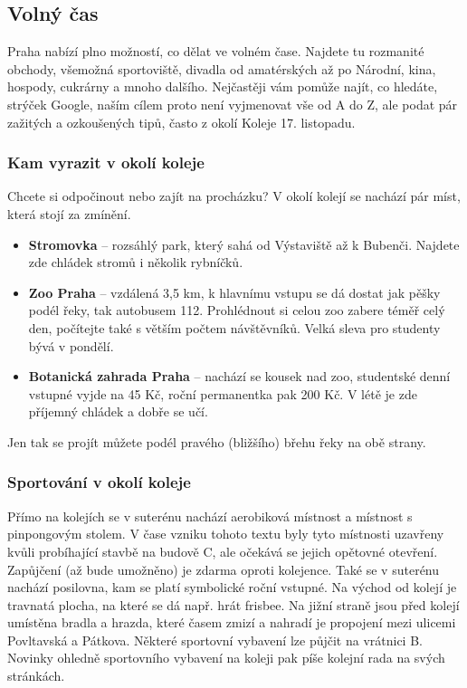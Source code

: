 \subsection{Volný čas}
Praha nabízí plno možností, co dělat ve volném čase. Najdete tu rozmanité
obchody, všemožná sportoviště, divadla od amatérských až po Národní, kina,
hospody, cukrárny a mnoho dalšího. Nejčastěji vám pomůže najít,
co hledáte, strýček Google, naším cílem proto není vyjmenovat vše od A do Z, ale
podat pár zažitých a ozkoušených tipů, často z okolí Koleje 17. listopadu.


\subsubsection{Kam vyrazit v okolí koleje}
Chcete si odpočinout nebo zajít na procházku? V okolí kolejí se nachází pár míst, která stojí za zmínění.
\begin{itemize}
\item \textbf{Stromovka} – rozsáhlý park, který sahá od Výstaviště až k Bubenči. Najdete zde chládek stromů i několik rybníčků.
\item \textbf{Zoo Praha} – vzdálená 3,5 km, k hlavnímu vstupu se dá dostat jak
pěšky podél řeky, tak autobusem 112. Prohlédnout si celou zoo zabere téměř celý den, počítejte
také s větším počtem návštěvníků. Velká sleva pro studenty bývá v pondělí.
\item \textbf{Botanická zahrada Praha} – nachází se kousek nad zoo, studentské
denní vstupné vyjde na 45 Kč, roční permanentka pak 200 Kč. V létě je zde příjemný chládek a dobře se učí.
\end{itemize}
Jen tak se projít můžete podél pravého (bližšího) břehu řeky na obě strany.


\subsubsection{Sportování v okolí koleje}
Přímo na kolejích se v suterénu nachází aerobiková místnost a místnost s
pinpongovým stolem. V čase vzniku tohoto textu byly tyto místnosti uzavřeny
kvůli probíhající stavbě na budově C, ale očekává se jejich opětovné otevření.
Zapůjčení (až bude umožněno) je zdarma oproti kolejence. Také se v suterénu
nachází posilovna, kam se platí symbolické roční vstupné. Na východ od kolejí je
travnatá plocha, na které se dá např. hrát frisbee. Na jižní straně jsou před kolejí umístěna bradla
a hrazda, které časem zmizí a nahradí je propojení mezi ulicemi Povltavská
a Pátkova. Některé sportovní vybavení lze půjčit na vrátnici B. Novinky ohledně
sportovního vybavení na koleji pak píše kolejní rada na svých stránkách.


